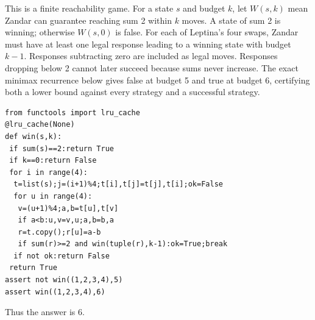 This is a finite reachability game. For a state $ s $ and budget $ k $, let $ W(s,k)$ mean Zandar can guarantee reaching sum 2 within $ k $ moves. A state of sum 2 is winning; otherwise $ W(s,0)$ is false. For each of Leptina's four swaps, Zandar must have at least one legal response leading to a winning state with budget $ k-1 $. Responses subtracting zero are included as legal moves. Responses dropping below 2 cannot later succeed because sums never increase. The exact minimax recurrence below gives false at budget 5 and true at budget 6, certifying both a lower bound against every strategy and a successful strategy.
\begin{verbatim}
from functools import lru_cache
@lru_cache(None)
def win(s,k):
 if sum(s)==2:return True
 if k==0:return False
 for i in range(4):
  t=list(s);j=(i+1)%4;t[i],t[j]=t[j],t[i];ok=False
  for u in range(4):
   v=(u+1)%4;a,b=t[u],t[v]
   if a<b:u,v=v,u;a,b=b,a
   r=t.copy();r[u]=a-b
   if sum(r)>=2 and win(tuple(r),k-1):ok=True;break
  if not ok:return False
 return True
assert not win((1,2,3,4),5)
assert win((1,2,3,4),6)
\end{verbatim}
Thus the answer is $\boxed6 $.
